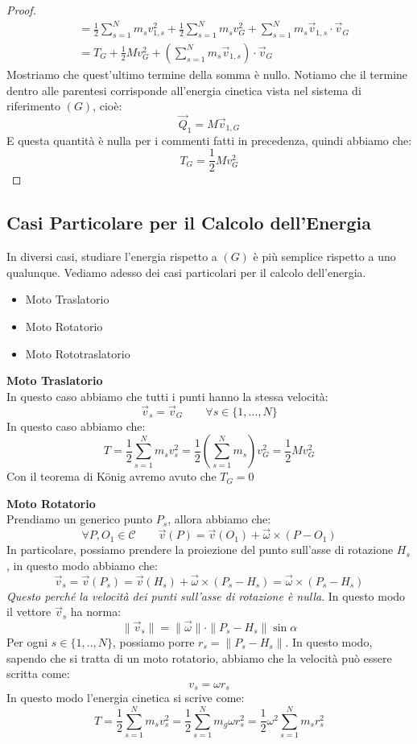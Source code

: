 \documentclass[11pt,a4paper,twoside]{article}
\theoremstyle{definition}
\begin{document}
\begin{proof}
\begin{align*}
		&= \frac 12 \sum_{s = 1}^N m_s v_{1,s}^2 + \frac 12 \sum_{s = 1}^N m_s v_G^2 + \sum_{s = 1}^N m_s \vec v_{1,s}\cdot \vec v_{G}\\
		&= T_G + \frac 12 Mv_G^2 + \left(\sum_{s=1}^N m_s \vec v_{1,s}\right)\cdot \vec v_G
	\end{align*}
	Mostriamo che quest'ultimo termine della somma è nullo. Notiamo che il termine dentro alle parentesi corrisponde all'energia cinetica vista nel sistema di riferimento $(G)$, cioè:
	\[ \vec Q_1 = M\vec v_{1,G} \]
	E questa quantità è nulla per i commenti fatti in precedenza, quindi abbiamo che:
	\[ T_G = \frac 12 Mv_{G}^2 \]
\end{proof}

\subsection{Casi Particolare per il Calcolo dell'Energia}

In diversi casi, studiare l'energia rispetto a $(G)$ è più semplice rispetto a uno qualunque. Vediamo adesso dei casi particolari per il calcolo dell'energia.
\begin{itemize}
	\item Moto Traslatorio
	\item Moto Rotatorio
	\item Moto Rototraslatorio
\end{itemize}

\textbf{Moto Traslatorio}\\
In questo caso abbiamo che tutti i punti hanno la stessa velocità:
\[ \vec v_s = \vec v_G \qquad \forall s \in \{1,...,N\} \]
In questo caso abbiamo che:
\[ T = \frac 12 \sum_{s = 1}^N m_s v_s^2 = \frac 12 \left(\sum_{s = 1}^N m_s\right) v_G^2 = \frac 12 Mv_G^2\]
Con il teorema di König avremo avuto che $T_G = 0$

\textbf{Moto Rotatorio}\\
Prendiamo un generico punto $P_s$, allora abbiamo che:
\[ \forall P,O_1 \in \mathscr C \qquad \vec v(P) = \vec v(O_1) + \vec \omega \times (P-O_1) \]
In particolare, possiamo prendere la proiezione del punto sull'asse di rotazione $H_s$, in questo modo abbiamo che:
\[ \vec v_s = \vec v(P_s) = \vec v(H_s) + \vec \omega \times (P_s - H_s) = \vec \omega \times (P_s - H_s) \]
\textit{Questo perché la velocità dei punti sull'asse di rotazione è nulla}. In questo modo il vettore $\vec v_s$ ha norma:
\[ \| \vec v_s\| = \|\vec \omega\| \cdot \|P_s -H_s\| \sin \alpha \]
Per ogni $s \in \{1,..,N\}$, possiamo porre $r_s = \|P_s - H_s\|$. In questo modo, sapendo che si tratta di un moto rotatorio, abbiamo che la velocità può essere scritta come:
\[ v_s = \omega r_s \]
In questo modo l'energia cinetica si scrive come:
\[ T = \frac 12 \sum_{s = 1}^N m_s v_s^2 = \frac 12 \sum_{s = 1}^N m_g \omega r_s^2 = \frac 12 \omega^2 \sum_{s = 1}^N m_sr_s^2 \]
\end{document}
